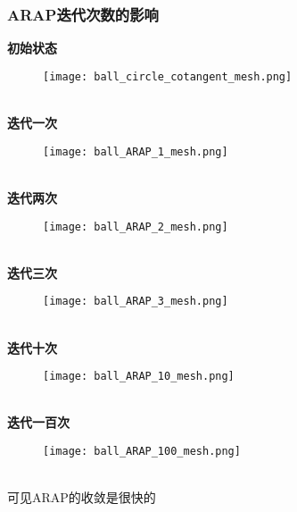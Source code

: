 \documentclass[14pt]{scrartcl} %
\begin{document}
 \subsubsection{ARAP迭代次数的影响}
\textbf{初始状态}
\begin{figure}[h] %
	\centering
	\texttt{[image: ball\_circle\_cotangent\_mesh.png]} %
\end{figure}
\\
\textbf{迭代一次}
\begin{figure}[h] %
	\centering
	\texttt{[image: ball\_ARAP\_1\_mesh.png]} %
\end{figure}
\pagebreak
\\
\textbf{迭代两次}
\begin{figure}[h] %
	\centering
	\texttt{[image: ball\_ARAP\_2\_mesh.png]} %
	\end{figure}
\\
\textbf{迭代三次}
\begin{figure}[h] %
	\centering
	\texttt{[image: ball\_ARAP\_3\_mesh.png]} %
\end{figure}
\pagebreak
\\
\textbf{迭代十次}
\begin{figure}[h] %
	\centering
	\texttt{[image: ball\_ARAP\_10\_mesh.png]} %
\end{figure}
\\
\textbf{迭代一百次}
\begin{figure}[h] %
	\centering
	\texttt{[image: ball\_ARAP\_100\_mesh.png]} %
\end{figure}
\\
可见ARAP的收敛是很快的
\pagebreak
\end{document}
